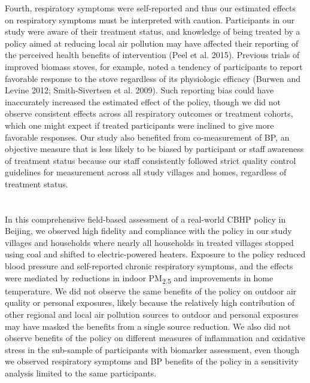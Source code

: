 \documentclass[
  letterpaper,
  DIV=11,
  numbers=noendperiod]{scrartcl}
\providecommand{\DIFadd}[1]{{\protect\color{blue}\uwave{#1}}} %
\providecommand{\DIFaddbegin}{} %
\providecommand{\DIFaddend}{} %
\providecommand{\DIFdelbegin}{} %
\providecommand{\DIFdelend}{} %
\newcommand{\DIFscaledelfig}{0.5}
\newlength{\DIFdelgraphicswidth} %
\newlength{\DIFdelgraphicsheight} %
\newcommand{\DIFaddincludegraphics}[2][]{{\color{blue}\fbox{\DIFOincludegraphics[#1]{#2}}}} %
\newcommand{\DIFdelincludegraphics}[2][]{%
\sbox{\DIFdelgraphicsbox}{\DIFOincludegraphics[#1]{#2}}%
\settoboxwidth{\DIFdelgraphicswidth}{\DIFdelgraphicsbox} %
\settoboxtotalheight{\DIFdelgraphicsheight}{\DIFdelgraphicsbox} %
\scalebox{\DIFscaledelfig}{%
\parbox[b]{\DIFdelgraphicswidth}{\usebox{\DIFdelgraphicsbox}\\[-\baselineskip] \rule{\DIFdelgraphicswidth}{0em}}\llap{\resizebox{\DIFdelgraphicswidth}{\DIFdelgraphicsheight}{%
\setlength{\unitlength}{\DIFdelgraphicswidth}%
\begin{picture}(1,1)%
\thicklines\linethickness{2pt} %
{\color[rgb]{1,0,0}\put(0,0){\framebox(1,1){}}}%
{\color[rgb]{1,0,0}\put(0,0){\line( 1,1){1}}}%
{\color[rgb]{1,0,0}\put(0,1){\line(1,-1){1}}}%
\end{picture}%
}\hspace*{3pt}}} %
} %
\DeclareRobustCommand{\DIFaddbegin}{\DIFOaddbegin \let\includegraphics\DIFaddincludegraphics} %
\DeclareRobustCommand{\DIFaddend}{\DIFOaddend \let\includegraphics\DIFOincludegraphics} %
\DeclareRobustCommand{\DIFdelbegin}{\DIFOdelbegin \let\includegraphics\DIFdelincludegraphics} %
\DeclareRobustCommand{\DIFdelend}{\DIFOaddend \let\includegraphics\DIFOincludegraphics} %
\begin{document}
Fourth, respiratory symptoms were self-reported and thus our estimated
effects on respiratory symptoms must be interpreted with caution.
Participants in our study were aware of their treatment status, and
knowledge of being treated by a policy aimed at reducing local air
pollution may have affected their reporting of the perceived health
benefits of intervention (Peel et al. 2015). Previous trials of improved
biomass stoves, for example, noted a tendency of participants to report
favorable response to the stove regardless of its physiologic efficacy
(Burwen and Levine 2012; Smith-Sivertsen et al. 2009). Such reporting
bias could have inaccurately increased the estimated effect of the
policy, though we did not observe consistent effects across all
respiratory outcomes or treatment cohorts, which one might expect if
treated participants were inclined to give more favorable responses. Our
study also benefited from co-measurement of BP, an objective measure
that is less likely to be biased by participant or staff awareness of
treatment status because our staff consistently followed strict quality
control guidelines for measurement across all study villages and homes,
regardless of treatment status.

\DIFdelbegin %
\DIFdelend \DIFaddbegin \section{\DIFadd{Implications of Findings}}\label{implications-of-findings}
\DIFaddend 

In this comprehensive field-based assessment of a real-world CBHP policy
in Beijing, we observed high fidelity and compliance with the policy in
our study villages and households where nearly all households in treated
villages stopped using coal and shifted to electric-powered heaters.
Exposure to the policy reduced blood pressure and self-reported chronic
respiratory symptoms, and the effects were mediated by reductions in
indoor PM\textsubscript{2.5} and improvements in home temperature. We
did not observe the same benefits of the policy on outdoor air quality
or personal exposures, likely because the relatively high contribution
of other regional and local air pollution sources to outdoor and
personal exposures may have masked the benefits from a single source
reduction. We also did not observe benefits of the policy on different
measures of inflammation and oxidative stress in the sub-sample of
participants with biomarker assessment, even though we observed
respiratory symptoms and BP benefits of the policy in a sensitivity
analysis limited to the same participants.
\end{document}
